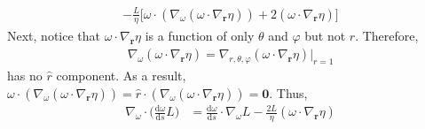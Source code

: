 \documentclass[10pt]{article}
\newcommand{\dee}{\mathrm{d}}
\newcommand{\ve}[1]{\mathbf{#1}}
\begin{document}
\begin{itemize}
\begin{align*}
      - \frac{L}{\eta} \big[ \omega \cdot (\nabla_\omega(\omega \cdot \nabla_{\ve{r}} \eta)) 
      + 2 (\omega \cdot \nabla_{\ve{r}} \eta) \big]
    \end{align*}
    Next, notice that $\omega \cdot \nabla_\ve{r}\eta$ is a function of only $\theta$ and $\varphi$ but not $r$. Therefore, 
    \begin{align*}
      \nabla_\omega(\omega \cdot \nabla_\ve{r}\eta) = \nabla_{r,\theta,\varphi}(\omega \cdot \nabla_{\ve{r}}\eta) \big|_{r=1}
    \end{align*}
    has no $\hat r$ component. As a result, $\omega \cdot (\nabla_\omega(\omega \cdot \nabla_\ve{r}\eta)) = \hat r \cdot (\nabla_\omega(\omega \cdot \nabla_\ve{r}\eta)) = \ve{0}.$ Thus,
    \begin{align*}
      \nabla_{\omega} \cdot \bigg( \frac{\dee \omega}{\dee s} L \bigg)
      &= \frac{\dee \omega}{\dee s} \cdot \nabla_{\omega} L 
      - \frac{2L}{\eta}(\omega \cdot \nabla_{\ve{r}} \eta)
    \end{align*}


\end{itemize}
\end{document}
